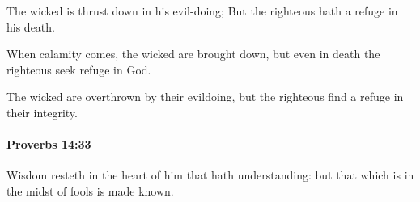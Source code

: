 			\begin{versebox}
					\item[BHS] 
					\item[ASV] The wicked is thrust down in his evil-doing; But the righteous hath a refuge in his death.
					\item[NIV] When calamity comes, the wicked are brought down, but even in death the righteous seek refuge in God.
					\item[NRSV] The wicked are overthrown by their evildoing, but the righteous find a refuge in their integrity.
			\end{versebox}

		\paragraph{Proverbs 14:33} %
			\label{PROVERBS-14-33}

			Wisdom resteth in the heart of him that hath understanding: but that which is in the midst of fools is made known.

